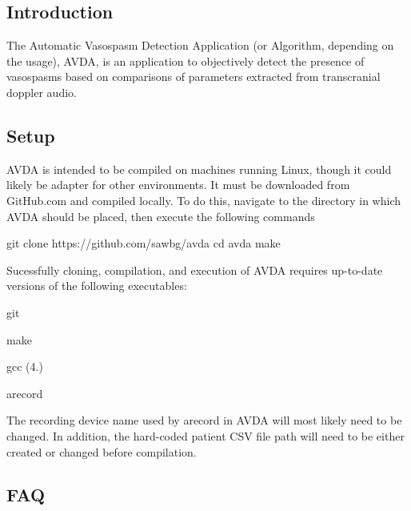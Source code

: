\subsection*{Introduction}

The Automatic Vasospasm Detection Application (or Algorithm, depending on the usage), A\+V\+D\+A, is an application to objectively detect the presence of vasospasms based on comparisons of parameters extracted from transcranial doppler audio.

\subsection*{Setup}

A\+V\+D\+A is intended to be compiled on machines running Linux, though it could likely be adapter for other environments. It must be downloaded from Git\+Hub.\+com and compiled locally. To do this, navigate to the directory in which A\+V\+D\+A should be placed, then execute the following commands \begin{DoxyVerb}git clone https://github.com/sawbg/avda
cd avda
make
\end{DoxyVerb}


Sucessfully cloning, compilation, and execution of A\+V\+D\+A requires up-\/to-\/date versions of the following executables\+:


\begin{DoxyItemize}
\item git
\item make
\item gcc (4.)
\item arecord
\end{DoxyItemize}

The recording device name used by arecord in A\+V\+D\+A will most likely need to be changed. In addition, the hard-\/coded patient C\+S\+V file path will need to be either created or changed before compilation.

\subsection*{F\+A\+Q}


